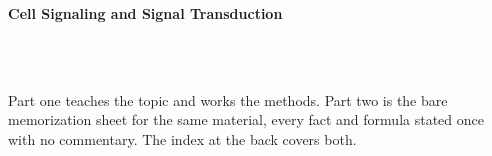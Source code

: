 



\makeindex[title={Index of This Volume},columns=2,intoc]

\begin{titlepage}\thispagestyle{empty}
\vspace*{0.14\textheight}
\noindent{\color{tiercore}\rule{\textwidth}{5pt}}\\[3pt]
\noindent{\color{bioline}\rule{\textwidth}{1pt}}\\[26pt]
\\[12pt]
\noindent\begin{minipage}{\textwidth}\raggedright
{\sffamily\bfseries\fontsize{28}{32}\selectfont\color{bioink}%
 \hyphenchar{} Cell Signaling and Signal Transduction\par}\end{minipage}\\[16pt]
\noindent{\color{biogreen}\rule{\textwidth}{1.4pt}}\\[10pt]
\noindent\begin{minipage}{\textwidth}\raggedright
{\fontsize{10.5}{14}\selectfont\color{biogreen}%
Part one teaches the topic and works the methods. Part two is the bare memorization sheet for the
same material, every fact and formula stated once with no commentary. The index at the back covers both.\par}\end{minipage}
\vfill
\noindent{\color{bioline}\rule{\textwidth}{1pt}}\\[3pt]
\noindent{\color{tiercore}\rule{\textwidth}{5pt}}
\end{titlepage}
\tableofcontents
\clearpage
{}
\clearpage
\printindex

